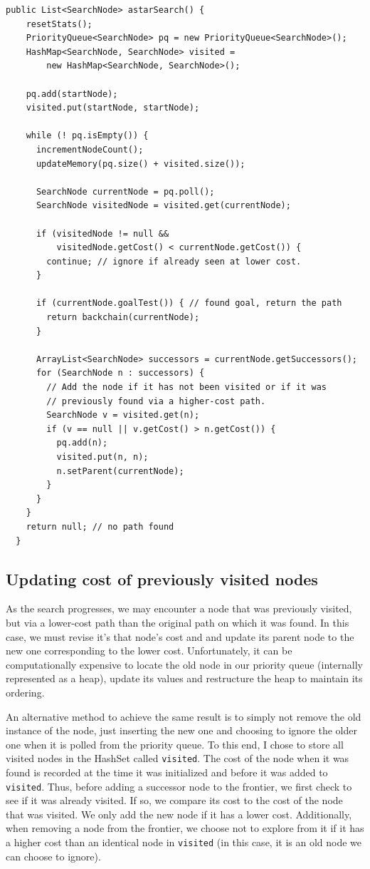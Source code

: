 \documentclass{article}
\begin{document}
\vspace{10mm}

\begin{lstlisting}
public List<SearchNode> astarSearch() {  
    resetStats();
    PriorityQueue<SearchNode> pq = new PriorityQueue<SearchNode>();
    HashMap<SearchNode, SearchNode> visited = 
        new HashMap<SearchNode, SearchNode>();
    
    pq.add(startNode);
    visited.put(startNode, startNode);
    
    while (! pq.isEmpty()) {
      incrementNodeCount();
      updateMemory(pq.size() + visited.size());
      
      SearchNode currentNode = pq.poll();
      SearchNode visitedNode = visited.get(currentNode);
      
      if (visitedNode != null && 
          visitedNode.getCost() < currentNode.getCost()) {
        continue; // ignore if already seen at lower cost.
      }
      
      if (currentNode.goalTest()) { // found goal, return the path
        return backchain(currentNode);
      }
      
      ArrayList<SearchNode> successors = currentNode.getSuccessors();
      for (SearchNode n : successors) {
        // Add the node if it has not been visited or if it was
        // previously found via a higher-cost path.
        SearchNode v = visited.get(n);
        if (v == null || v.getCost() > n.getCost()) {
          pq.add(n);
          visited.put(n, n);
          n.setParent(currentNode);
        }
      }
    }
    return null; // no path found
  }
\end{lstlisting}

\subsection{Updating cost of previously visited nodes}
As the search progresses, we may encounter a node that was previously visited, but via a lower-cost path than the original path on which it was found. In this case, we must revise it's that node's cost and and update its parent node to the new one corresponding to the lower cost. Unfortunately, it can be computationally expensive to locate the old node in our priority queue (internally represented as a heap), update its values and restructure the heap to maintain its ordering. 

An alternative method to achieve the same result is to simply not remove the old instance of the node, just inserting the new one and choosing to ignore the older one when it is polled from the priority queue. To this end, I chose to store all visited nodes in the HashSet called \verb`visited`. The cost of the node when it was found is recorded at the time it was initialized and before it was added to \verb`visited`. Thus, before adding a successor node to the frontier, we first check to see if it was already visited. If so, we compare its cost to the cost of the node that was visited. We only add the new node if it has a lower cost. Additionally, when removing a node from the frontier, we choose not to explore from it if it has a higher cost than an identical node in \verb`visited` (in this case, it is an old node we can choose to ignore).
\end{document}
